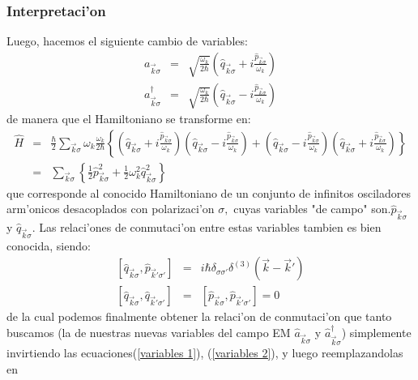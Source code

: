 \subsubsection{Interpretaci'on}
Luego, hacemos el siguiente cambio de variables:%
\begin{eqnarray}
a_{\vec{k}\sigma} & = &\sqrt{\frac{\omega_{k}}{2\hbar}}\left( \hat{q}%
_{\vec{k}\sigma}+i\frac{\hat{p}_{\vec{k}\sigma}}{\omega_{k}}\right)
\label{variables 1}\\
a_{\vec{k}\sigma}^{\dagger} & = &\sqrt{\frac{\omega_{k}}{2\hbar}}\left(
\hat{q}_{\vec{k}\sigma}-i\frac{\hat{p}_{\vec{k}\sigma}}{\omega_{k}}\right)
\label{variables 2}%
\end{eqnarray}
de manera que el Hamiltoniano se transforme en:%
\begin{eqnarray}
\hat{H} & = &\frac{\hbar}{2}\sum_{\vec{k}\sigma}\omega_{k}\frac{\omega
_{k}}{2\hbar}\left\{ \left( \hat{q}_{\vec{k}\sigma}+i\frac{\hat{p}_{\vec
{k}\sigma}}{\omega_{k}}\right) \left( \hat{q}_{\vec{k}\sigma}-i\frac
{\hat{p}_{\vec{k}\sigma}}{\omega_{k}}\right) +\left( \hat{q}_{\vec{k}%
\sigma}-i\frac{\hat{p}_{\vec{k}\sigma}}{\omega_{k}}\right) \left( \hat
{q}_{\vec{k}\sigma}+i\frac{\hat{p}_{\vec{k}\sigma}}{\omega_{k}}\right)
\right\} \\
& = &\sum_{\vec{k}\sigma}\left\{ \frac{1}{2}\hat{p}_{\vec{k}\sigma}%
^{2}+\frac{1}{2}\omega_{k}^{2}\hat{q}_{\vec{k}\sigma}^{2}\right\}
\end{eqnarray}
que corresponde al conocido Hamiltoniano de un conjunto de infinitos
osciladores arm'onicos desacoplados con polarizaci'on $\sigma,$ cuyas
variables "de campo" son.$\hat{p}_{\vec{k}\sigma}$ y $\hat{q}_{\vec{k}\sigma}%
$. Las relaci'ones de conmutaci'on entre estas variables tambien es bien
conocida, siendo:%
\begin{eqnarray}
\left[ \hat{q}_{\vec{k}\sigma},\hat{p}_{\vec{k}'\sigma '}\right] & = &i\hbar\delta_{\sigma\sigma '}\delta^{\left( 3\right) }\left( \vec{k}-\vec{k}'\right) \label{Conmutador Osciladores Desacoplados}\\
\left[ \hat{q}_{\vec{k}\sigma},\hat{q}_{\vec{k}'\sigma '}\right] & = &\left[ \hat{p}_{\vec{k}\sigma},\hat{p}_{\vec{k}'\sigma '}\right] =0\nonumber
\end{eqnarray}
de la cual podemos finalmente obtener la relaci'on de conmutaci'on que
tanto buscamos (la de nuestras nuevas variables del campo EM $\hat{a}_{\vec
{k}\sigma}$ y $\hat{a}_{\vec{k}\sigma}^{\dagger}$) simplemente invirtiendo las
ecuaciones(\ref{variables 1}), (\ref{variables 2}), y luego reemplazandolas en
